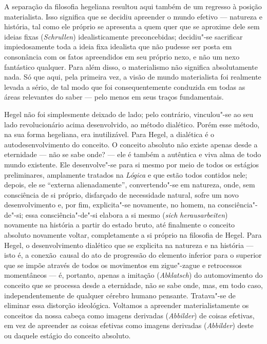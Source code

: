 A separação da filosofia hegeliana resultou aqui também de um regresso à
posição materialista. Isso significa que se decidiu apreender o mundo
efetivo --- natureza e história, tal como ele próprio se apresenta a quem
quer que se aproxime dele sem ideias fixas (\emph{Schrullen})
idealisticamente preconcebidas; decidiu"-se sacrificar impiedosamente
toda a ideia fixa idealista que não pudesse ser posta em consonância com
os fatos apreendidos em seu próprio nexo, e não um nexo fantástico
qualquer. Para além disso, o materialismo não significa absolutamente
nada. Só que aqui, pela primeira vez, a visão de mundo materialista foi
realmente levada a sério, de tal modo que foi consequentemente conduzida
em todas as áreas relevantes do saber --- pelo menos em seus traços
fundamentais.

Hegel não
foi simplesmente deixado de lado; pelo contrário, vinculou"-se ao seu
lado revolucionário acima desenvolvido, ao método dialético. Porém esse
método, na sua forma hegeliana, era inutilizável.
Para Hegel,
a dialética é o autodesenvolvimento do conceito. O conceito absoluto não
existe apenas desde a eternidade --- não se sabe onde? --- ele é também a
autêntica e viva alma de todo mundo existente. Ele desenvolve"-se para si
mesmo por meio de todos os estágios preliminares, amplamente tratados na
\emph{Lógica} e que estão todos contidos nele; depois, ele se ``externa
alienadamente'', convertendo"-se em natureza, onde, sem consciência de si
próprio, disfarçado de necessidade natural, sofre um novo
desenvolvimento e, por fim, explicita"-se novamente, no homem, na
consciência"-de"-si; essa consciência"-de"-si elabora a si mesmo (\emph{sich
herausarbeiten}) novamente na história a partir do estado bruto, até
finalmente o conceito absoluto novamente voltar, completamente a si
próprio na filosofia
de Hegel.
Para Hegel,
o desenvolvimento dialético que se explicita na natureza e na história ---
isto é, a conexão\est\ causal do ato de progressão do elemento inferior para
o superior que se impõe através de todos os movimentos em zigue"-zague e
retrocessos momentâneos --- é, portanto, apenas a imitação
(\emph{Abklatsch}) do automovimento do conceito que se processa desde a
eternidade, não se sabe onde, mas, em todo caso, independentemente de
qualquer cérebro humano pensante. Tratava"-se de eliminar essa distorção
ideológica. Voltamos a apreender materialistamente os conceitos da nossa
cabeça como imagens derivadas (\emph{Abbilder}) de coisas efetivas, em
vez de apreender as coisas efetivas como imagens derivadas
(\emph{Abbilder}) deste ou daquele estágio do conceito absoluto.
